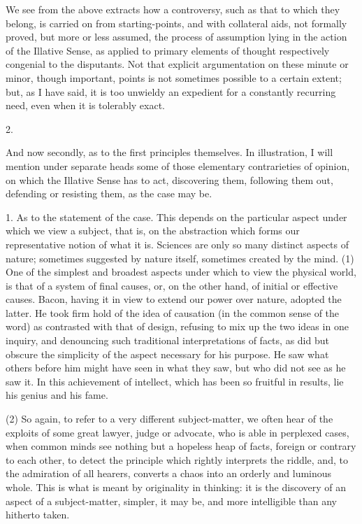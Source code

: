 We see from the above extracts how a controversy, such as that to
which they belong, is carried on from starting-points, and with
collateral aids, not formally proved, but more or less assumed, the
process of assumption lying in the action of the Illative Sense, as
applied to primary elements of thought respectively congenial to the
disputants. Not that explicit argumentation on these minute or minor,
though important, points is not sometimes possible to a certain
extent; but, as I have said, it is too unwieldy an expedient for a
constantly recurring need, even when it is tolerably exact.

2.

And now secondly, as to the first principles themselves. In
illustration, I will mention under separate heads some of those
elementary contrarieties of opinion, on which the Illative Sense has
to act, discovering them, following them out, defending or resisting
them, as the case may be.

1. As to the statement of the case. This depends on the
particular aspect under which we view a subject, that is, on the
abstraction which forms our representative notion of what it is.
Sciences are only so many distinct aspects of nature; sometimes
suggested by nature itself, sometimes created by the mind. (1) One of
the simplest and broadest aspects under which to view the physical
world, is that of a system of final causes, or, on the other hand, of
initial or effective causes. Bacon, having it in view to extend our
power over nature, adopted the latter. He took firm hold of the idea
of causation (in the common sense of the word) as contrasted with that
of design, refusing to mix up the two ideas in one inquiry, and
denouncing such traditional interpretations of facts, as did but
obscure the simplicity of the aspect necessary for his purpose. He saw
what others before him might have seen in what they saw, but who did
not see as he saw it. In this achievement of intellect, which has been
so fruitful in results, lie his genius and his fame.

(2) So again, to refer to a very different subject-matter, we often
hear of the exploits of some great lawyer, judge or advocate, who is
able in perplexed cases, when common minds see nothing but a hopeless
heap of facts, foreign or contrary to each other, to detect the
principle which rightly interprets the riddle, and, to the admiration
of all hearers, converts a chaos into an orderly and luminous whole.
This is what is meant by originality in thinking: it is the discovery
of an aspect of a subject-matter, simpler, it may be, and more
intelligible than any hitherto taken.

